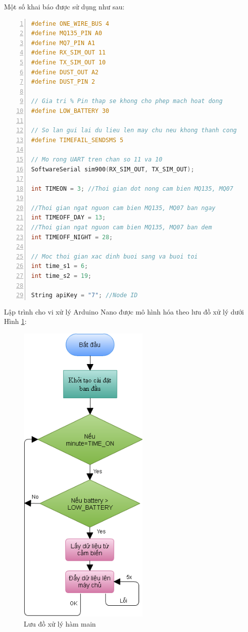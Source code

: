 Một số khai báo được sử dụng như sau:
\begin{lstlisting}[numbers=left,firstnumber=1,language=C]
#define ONE_WIRE_BUS 4
#define MQ135_PIN A0
#define MQ7_PIN A1
#define RX_SIM_OUT 11
#define TX_SIM_OUT 10
#define DUST_OUT A2
#define DUST_PIN 2

// Gia tri % Pin thap se khong cho phep mach hoat dong
#define LOW_BATTERY 30 

// So lan gui lai du lieu len may chu neu khong thanh cong
#define TIMEFAIL_SENDSMS 5 

// Mo rong UART tren chan so 11 va 10
SoftwareSerial sim900(RX_SIM_OUT, TX_SIM_OUT);

int TIMEON = 3; //Thoi gian dot nong cam bien MQ135, MQ07

//Thoi gian ngat nguon cam bien MQ135, MQ07 ban ngay
int TIMEOFF_DAY = 13; 
//Thoi gian ngat nguon cam bien MQ135, MQ07 ban dem
int TIMEOFF_NIGHT = 28;

// Moc thoi gian xac dinh buoi sang va buoi toi
int time_s1 = 6;
int time_s2 = 19;

String apiKey = "7"; //Node ID
\end{lstlisting}
Lập trình cho vi xử lý Arduino Nano được mô hình hóa theo lưu đồ xử lý dưới Hình \ref{fig:node_status}:

\begin{figure}[H]
	\centering    
	\includegraphics[width=2.5in]{node_status}
	\caption[Lưu đồ xử lý hàm main]{Lưu đồ xử lý hàm main}
	\label{fig:node_status}
\end{figure}

